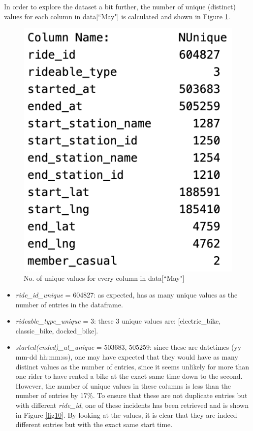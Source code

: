 \documentclass[12pt]{article}
\begin{document}
\begin{itemize}
In order to explore the dataset a bit further, the number of unique (distinct) values for each column in data[``May"] is calculated and shown in Figure \ref{fig2}. 
	\begin{figure}[h]
	\centering
	\includegraphics[scale = 0.6]{imgUnique.png} %
	\caption{No. of unique values for every column in data[``May"]}
	\label{fig2}
	\end{figure}
	
\begin{itemize}
	\item \textit{ride\_id\_unique}  = 604827: as expected, has as many unique values as the number of entries in the dataframe.
	\item \textit{rideable\_type\_unique} = 3: these 3 unique values are:  [electric\_bike, classic\_bike, docked\_bike].
	\item \textit{started(ended)\_at\_unique} = 503683,  505259: since these are datetimes (yy-mm-dd hh:mm:ss), one may have expected that they would have as many distinct values as the number of entries, since it seems unlikely for more than one rider to have rented a bike at the exact same time down to the second. However, the number of unique values in these columns is less than the number of entries by 17\%. To ensure that these are not duplicate entries but with different \textit{ride\_id}, one of these incidents has been retrieved and is shown in Figure \ref{fig10}. By looking at the values, it is clear that they are indeed different entries but with the exact same start time.
	

\end{itemize}
\end{itemize}
\end{document}
